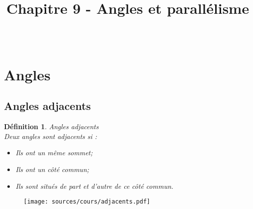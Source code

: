 \documentclass[paper=a4, fontsize=10pt]{scrartcl} %
\title{	
  \vspace{-10ex}
  \horrule{0.5pt} \\[0.4cm] %
  \huge Chapitre 9 - Angles et parallélisme\\ %
  \horrule{2pt} \\[0.5cm] %
}
\author{}
\date{\vspace{-10ex}} %
\begin{document}

\newtheorem{Definition}{Définition}
\newtheorem{Theorem}{Théorème}
\newtheorem{Proposition}{Propriété}

\renewcommand{\labelitemi}{$\bullet$}
\renewcommand{\labelitemii}{$\circ$}

\maketitle %



\section{Angles}

\subsection{Angles adjacents}
\begin{multicols}{2}

  \begin{Definition}{Angles adjacents}\\
    Deux angles sont adjacents si :
    \begin{itemize}
    \item Ils ont un même sommet;
    \item Ils ont un côté commun;
    \item Ils sont situés de part et d'autre de ce côté commun.
    \end{itemize}
  \end{Definition}

  \begin{figure}[H]
    \centering
    \texttt{[image: sources/cours/adjacents.pdf]}
  \end{figure}
\end{multicols}
\end{document}
